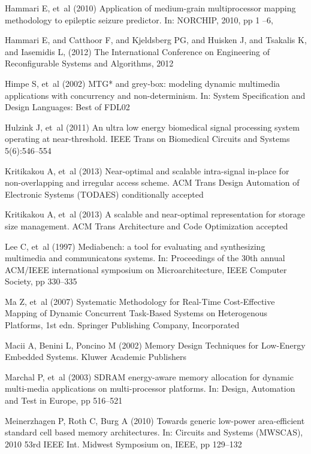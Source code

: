 \documentclass[smallcondensed]{svjour3}
\begin{document}
\begin{thebibliography}{41}
Hammari E, et~al (2010) Application of medium-grain multiprocessor mapping
  methodology to epileptic seizure predictor. In: NORCHIP, 2010, pp 1 --6,
  
Hammari E, and Catthoor F, and Kjeldsberg PG, and Huisken J, and Tsakalis K, and Iasemidis L, (2012) The International Conference on Engineering of Reconfigurable Systems and Algorithms, 2012 

Himpe S, et~al (2002) {M}{T}{G}* and grey-box: modeling dynamic multimedia
  applications with concurrency and non-determinism. In: System Specification
  and Design Languages: Best of FDL02

Hulzink J, et~al (2011) An ultra low energy biomedical signal processing system
  operating at near-threshold. IEEE Trans on Biomedical Circuits and Systems
  5(6):546--554

Kritikakou A, et~al (2013{}) Near-optimal and scalable intra-signal
  in-place for non-overlapping and irregular access scheme. ACM Trans Design
  Automation of Electronic Systems (TODAES) conditionally accepted

Kritikakou A, et~al (2013{}) A scalable and near-optimal
  representation for storage size management. ACM Trans Architecture and Code
  Optimization accepted

Lee C, et~al (1997) Mediabench: a tool for evaluating and synthesizing
  multimedia and communicatons systems. In: Proceedings of the 30th annual
  ACM/IEEE international symposium on Microarchitecture, IEEE Computer Society,
  pp 330--335

Ma Z, et~al (2007) Systematic Methodology for Real-Time Cost-Effective Mapping
  of Dynamic Concurrent Task-Based Systems on Heterogenous Platforms, 1st edn.
  Springer Publishing Company, Incorporated

Macii A, Benini L, Poncino M (2002) Memory Design Techniques for Low-Energy
  Embedded Systems. Kluwer Academic Publishers

Marchal P, et~al (2003) {S}{D}{R}{A}{M} energy-aware memory allocation for
  dynamic multi-media applications on multi-processor platforms. In: Design,
  Automation and Test in Europe, pp 516--521

Meinerzhagen P, Roth C, Burg A (2010) Towards generic low-power area-efficient
  standard cell based memory architectures. In: Circuits and Systems (MWSCAS),
  2010 53rd IEEE Int. Midwest Symposium on, IEEE, pp 129--132


\end{thebibliography}
\end{document}
